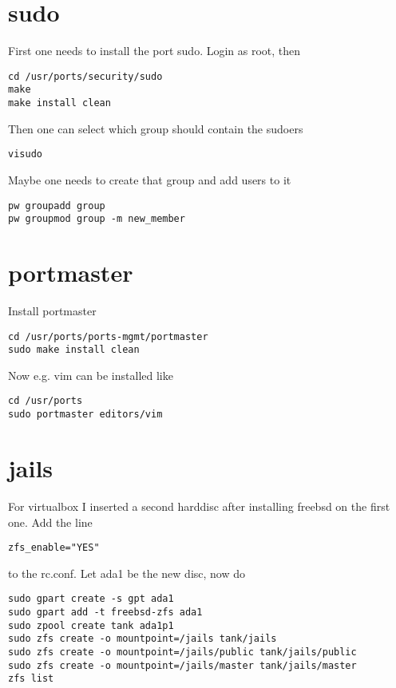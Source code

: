 \documentclass[a4paper]{article}
\begin{document}
\section{sudo}

First one needs to install the port sudo. Login as root, then

\begin{verbatim}
cd /usr/ports/security/sudo
make
make install clean
\end{verbatim}

Then one can select which group should contain the sudoers

\begin{verbatim}
visudo
\end{verbatim}

Maybe one needs to create that group and add users to it

\begin{verbatim}
pw groupadd group
pw groupmod group -m new_member
\end{verbatim}

\section{portmaster}
Install portmaster

\begin{verbatim}
cd /usr/ports/ports-mgmt/portmaster
sudo make install clean
\end{verbatim}

Now e.g. vim can be installed like

\begin{verbatim}
cd /usr/ports
sudo portmaster editors/vim
\end{verbatim}

\section{jails}
For virtualbox I inserted a second harddisc after installing freebsd on the first one.
Add the line

\begin{verbatim}
zfs_enable="YES"
\end{verbatim}

to the rc.conf.
Let ada1 be the new disc, now do

\begin{verbatim}
sudo gpart create -s gpt ada1
sudo gpart add -t freebsd-zfs ada1
sudo zpool create tank ada1p1
sudo zfs create -o mountpoint=/jails tank/jails
sudo zfs create -o mountpoint=/jails/public tank/jails/public
sudo zfs create -o mountpoint=/jails/master tank/jails/master
zfs list
\end{verbatim}
\end{document}
